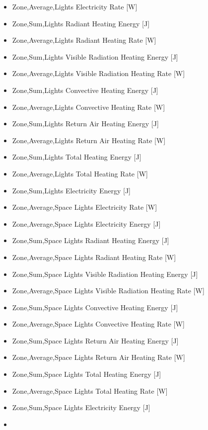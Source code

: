 \begin{itemize}
\item
  Zone,Average,Lights Electricity Rate {[}W{]}
\item
  Zone,Sum,Lights Radiant Heating Energy {[}J{]}
\item
  Zone,Average,Lights Radiant Heating Rate {[}W{]}
\item
  Zone,Sum,Lights Visible Radiation Heating Energy {[}J{]}
\item
  Zone,Average,Lights Visible Radiation Heating Rate {[}W{]}
\item
  Zone,Sum,Lights Convective Heating Energy {[}J{]}
\item
  Zone,Average,Lights Convective Heating Rate {[}W{]}
\item
  Zone,Sum,Lights Return Air Heating Energy {[}J{]}
\item
  Zone,Average,Lights Return Air Heating Rate {[}W{]}
\item
  Zone,Sum,Lights Total Heating Energy {[}J{]}
\item
  Zone,Average,Lights Total Heating Rate {[}W{]}
\item
  Zone,Sum,Lights Electricity Energy {[}J{]}
\item
  Zone,Average,Space Lights Electricity Rate {[}W{]}
\item
  Zone,Average,Space Lights Electricity Energy {[}J{]}
\item
  Zone,Sum,Space Lights Radiant Heating Energy {[}J{]}
\item
  Zone,Average,Space Lights Radiant Heating Rate {[}W{]}
\item
  Zone,Sum,Space Lights Visible Radiation Heating Energy {[}J{]}
\item
  Zone,Average,Space Lights Visible Radiation Heating Rate {[}W{]}
\item
  Zone,Sum,Space Lights Convective Heating Energy {[}J{]}
\item
  Zone,Average,Space Lights Convective Heating Rate {[}W{]}
\item
  Zone,Sum,Space Lights Return Air Heating Energy {[}J{]}
\item
  Zone,Average,Space Lights Return Air Heating Rate {[}W{]}
\item
  Zone,Sum,Space Lights Total Heating Energy {[}J{]}
\item
  Zone,Average,Space Lights Total Heating Rate {[}W{]}
\item
  Zone,Sum,Space Lights Electricity Energy {[}J{]}
\item

\end{itemize}
